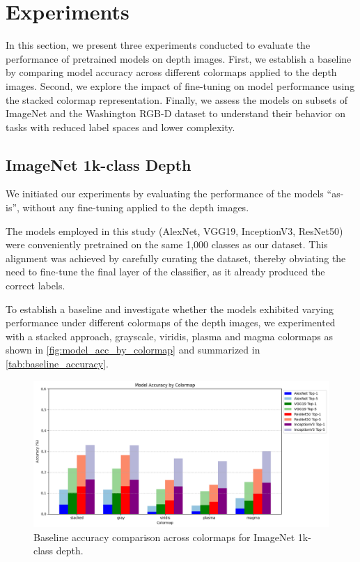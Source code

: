 \section{Experiments}
In this section, we present three experiments conducted to evaluate the performance of pretrained models on depth images. First, we establish a baseline by comparing model accuracy across different colormaps applied to the depth images. Second, we explore the impact of fine-tuning on model performance using the stacked colormap representation. Finally, we assess the models on subsets of ImageNet and the Washington RGB-D dataset to understand their behavior on tasks with reduced label spaces and lower complexity.

\subsection{ImageNet 1k-class Depth}
We initiated our experiments by evaluating the performance of the models ``as-is'', without any fine-tuning applied to the depth images.

The models employed in this study (AlexNet, VGG19, InceptionV3, ResNet50) were conveniently pretrained on the same 1,000 classes as our dataset. This alignment was achieved by carefully curating the dataset, thereby obviating the need to fine-tune the final layer of the classifier, as it already produced the correct labels.

To establish a baseline and investigate whether the models exhibited varying performance under different colormaps of the depth images, we experimented with a stacked approach, grayscale, viridis, plasma and magma colormaps as shown in \autoref{fig:model_acc_by_colormap} and summarized in \autoref{tab:baseline_accuracy}.

\begin{figure}[h]
    \centering
    \includegraphics[width=1\linewidth]{./images/model_acc_by_colormap.png}
    \caption{Baseline accuracy comparison across colormaps for ImageNet 1k-class depth.}
    \label{fig:model_acc_by_colormap}
\end{figure}


